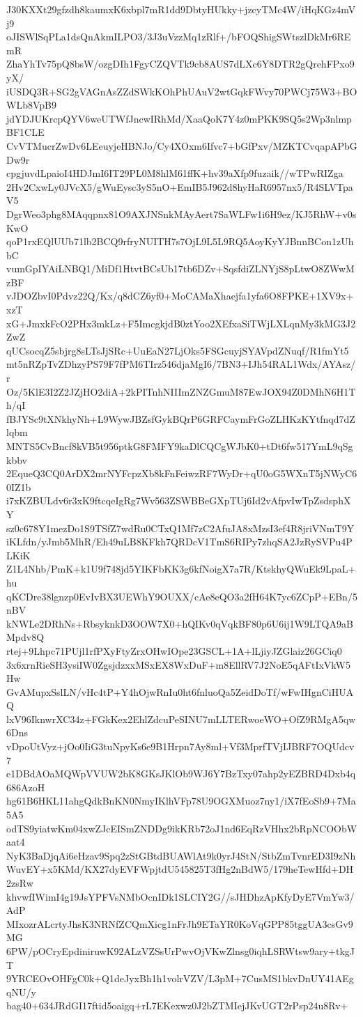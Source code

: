 J30KXXt29gfzdh8kaumxK6xbpl7mR1dd9DbtyHUkky+jzcyTMc4W/iHqKGz4mVj9
oJISWlSqPLa1dsQnAkmILPO3/3J3uVzzMq1zRlf+/bFOQShigSWtszlDkMr6REmR
ZhaYhTv75pQ8bsW/ozgDIh1FgyCZQVTk9cb8AUS7dLXc6Y8DTR2gQrehFPxo9yX/
iUSDQ3R+SG2gVAGnAsZZdSWkKOhPhUAuV2wtGqkFWvy70PWCj75W3+BOWLb8VpB9
jdYDJUKrcpQYV6weUTWfJncwIRhMd/XaaQoK7Y4z0mPKK9SQ5s2Wp3nlmpBF1CLE
CvVTMucrZwDv6LEeuyjeHBNJo/Cy4XOxm6Ifvc7+bGfPxv/MZKTCvqapAPbGDw9r
cpgjuvdLpaioI4HDJmI6IT29PL0M8hlM61ffK+hv39aXfp9fuzaik//wTPwRIZga
2Hv2CxwLy0JVcX5/gWuEysc3yS5nO+EmIB5J962d8hyHaR6957nx5/R4SLVTpaV5
DgrWeo3phg8MAqqpnx81O9AXJNSnkMAyAert7SaWLFw1i6H9ez/KJ5RhW+v0sKwO
qoP1rxEQlUUb71lb2BCQ9rfryNUITH7s7OjL9L5L9RQ5AoyKyYJBnnBCon1zUhbC
vumGpIYAiLNBQ1/MiDf1HtvtBCsUb17tb6DZv+SqsfdiZLNYjS8pLtwO8ZWwMzBF
vJDOZbvI0Pdvz22Q/Kx/q8dCZ6yf0+MoCAMaXhaejfa1yfa6O8FPKE+1XV9x+xzT
xG+JmxkFcO2PHx3mkLz+F5ImcgkjdB0ztYoo2XEfxaSiTWjLXLqnMy3kMG3J2ZwZ
qUCsocqZ5sbjrg8sLTsJjSRc+UuEaN27LjOks5FSGcuyjSYAVpdZNuqf/R1fmYt5
mt5nRZpTvZDhzyPS79F7fPM6TIrz546djaMgI6/7BN3+IJh54RAL1Wdx/AYAsz/r
Oz/5KlE3I2Z2JZjHO2diA+2kPITnhNIIImZNZGmuM87EwJOX94Z0DMhN6H1Th/qI
fBJYSc9tXNkhyNh+L9WywJBZsfGykBQrP6GRFCaymFrGoZLHKzKYtfnqd7dZlqbm
MNTS5CvBncf8kVB5t956ptkG8FMFY9kaDlCQCgWJbK0+tDt6fw517YmL9qSgkbbv
2EqueQ3CQ0ArDX2mrNYFcpzXb8kFnFeiwzRF7WyDr+qU0oG5WXnT5jNWyC60IZ1b
i7xKZBULdv6r3xK9ftcqeIgRg7Wv563ZSWBBeGXpTUj6Id2vAfpvIwTpZsdsphXY
sz0c678Y1mezDo1S9TSfZ7wdRu0CTxQ1Mf7zC2AfuJA8xMzsI3ef4R8jriVNmT9Y
iKLfdn/yJmb5MhR/Eh49uLB8KFkh7QRDcV1TmS6RIPy7zhqSA2JzRySVPu4PLKiK
Z1L4Nhb/PmK+k1U9f748jd5YIKFbKK3g6kfNoigX7a7R/KtskhyQWuEk9LpaL+hu
qKCDre38lgnzp0EvIvBX3UEWhY9OUXX/cAe8eQO3a2fH64K7yc6ZCpP+EBn/5nBV
kNWLe2DRhNs+RbsyknkD3OOW7X0+hQIKv0qVqkBF80p6U6ij1W9LTQA9aBMpdv8Q
rtej+9Lhpc71PUjl1rfPXyFtyZrxOHwIOpe23GSCL+1A+lLjiyJZGlaiz26GCiq0
3x6xrnRieSH3ysiIW0ZgsjdzxxMSxEX8WxDuF+m8EllRV7J2NoE5qAFtIxVkW5Hw
GvAMupxSslLN/vHc4tP+Y4hOjwRnIu0ht6fnluoQa5ZeidDoTf/wFwIHgnCiHUAQ
lxV96IknwrXC34z+FGkKex2EhlZdcuPeSINU7mLLTERwoeWO+OfZ9RMgA5qw6Dns
vDpoUtVyz+jOo0IiG3tuNpyKs6e9B1Hrpn7Ay8ml+Vf3MprfTVjIJBRF7OQUdcv7
e1DBdAOaMQWpVVUW2bK8GKsJKlOb9WJ6Y7BzTxy07ahp2yEZBRD4Dxb4q686AzoH
hg61B6HKL11ahgQdkBnKN0NmyIKlhVFp78U9OGXMuoz7ny1/iX7fEoSb9+7Ma5A5
odTS9yiatwKm04xwZJcEISmZNDDg9ikKRb72oJ1nd6EqRzVHhx2bRpNCOObWaat4
NyK3BaDjqAi6eHzav9Spq2zStGBtdBUAWlAt9k0yrJ4StN/StbZmTvnrED3I9zNh
WuvEY+x5KMd/KX27dyEVFWpjtdU545825T3fHg2nBdW5/179heTewHfd+DH2zsRw
khvwfIWimI4g19JsYPFVsNMbOcnIDk1SLCIY2G//sJHDhzApKfyDyE7VmYw3/AdP
MIxozrALcrtyJhsK3NRNfZCQmXicg1nFrJh9ETaYR0KoVqGPP85tggUA3csGv9MG
6PW/pOCryEpdiniruwK92ALzVZSsUrPwvOjVKwZlnsg0iqhLSRWtsw9ary+tkgJT
9YRCEOvOHFgC0k+Q1deJyxBh1h1volrVZV/L3pM+7CusMS1bkvDnUY41AEgqNU/y
bag40+634JRdGI17ftid5oaigq+rL7EKexwz0J2bZTMIejJKvUGT2rPsp24u8Rv+
